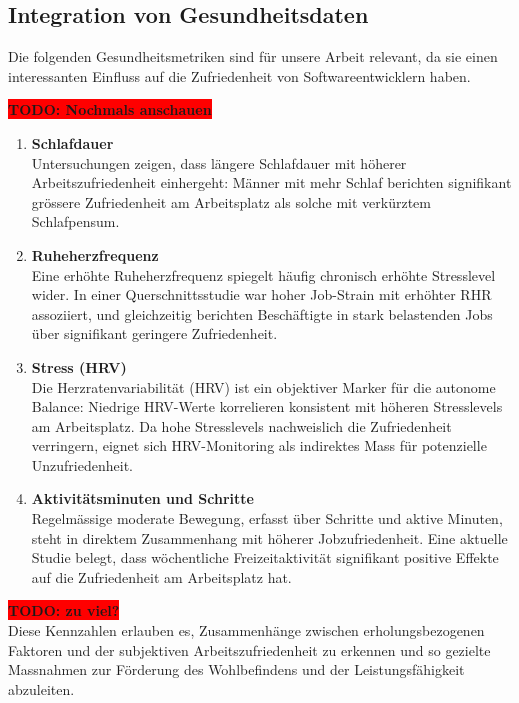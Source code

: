 \documentclass[12pt,a4paper]{report}
\newcommand{\todo}[1]{\colorbox{red}{\textbf{TODO: #1}}\\}
\begin{document}
\subsection{Integration von Gesundheitsdaten}

Die folgenden Gesundheitsmetriken sind für unsere Arbeit relevant, da sie einen interessanten Einfluss
auf die Zufriedenheit von Softwareentwicklern haben.

\todo{Nochmals anschauen}
\begin{enumerate}
	\item \textbf{Schlafdauer}\\
	      Untersuchungen zeigen, dass längere Schlafdauer mit höherer Arbeitszufriedenheit einhergeht:
	      Männer mit mehr Schlaf berichten signifikant grössere Zufriedenheit am Arbeitsplatz als
	      solche mit verkürztem Schlafpensum.

	\item \textbf{Ruheherzfrequenz}\\
	      Eine erhöhte Ruheherzfrequenz spiegelt häufig chronisch erhöhte Stresslevel wider. In einer
	      Querschnittsstudie war hoher Job-Strain mit erhöhter RHR assoziiert, und gleichzeitig berichten
	      Beschäftigte in stark belastenden Jobs über signifikant geringere Zufriedenheit.

	\item \textbf{Stress (HRV)}\\
	      Die Herzratenvariabilität (HRV) ist ein objektiver Marker für die autonome Balance: Niedrige
	      HRV-Werte korrelieren konsistent mit höheren Stresslevels am Arbeitsplatz. Da hohe Stresslevels
	      nachweislich die Zufriedenheit verringern, eignet sich HRV-Monitoring als indirektes Mass für
	      potenzielle Unzufriedenheit.

	\item \textbf{Aktivitätsminuten und Schritte}\\
	      Regelmässige moderate Bewegung, erfasst über Schritte und aktive Minuten, steht in direktem
	      Zusammenhang mit höherer Jobzufriedenheit. Eine aktuelle Studie belegt, dass wöchentliche
	      Freizeitaktivität signifikant positive Effekte auf die Zufriedenheit am Arbeitsplatz hat.
\end{enumerate}

\todo{zu viel?}
Diese Kennzahlen erlauben es, Zusammenhänge zwischen erholungsbezogenen Faktoren und der subjektiven
Arbeitszufriedenheit zu erkennen und so gezielte Massnahmen zur Förderung des Wohlbefindens und der
Leistungsfähigkeit abzuleiten.
\end{document}
